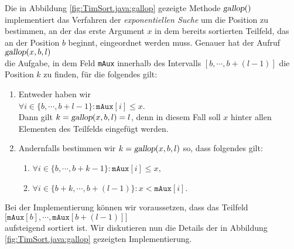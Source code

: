 Die in Abbildung \ref{fig:TimSort.java:gallop} gezeigte Methode $\textsl{gallop}()$ implementiert
das Verfahren der \emph{exponentiellen Suche} um die Position zu bestimmen, an der das erste
Argument $x$ in dem bereits sortierten Teilfeld, das an der Position $b$ beginnt,
eingeordnet werden muss.  Genauer hat der Aufruf
\\[0.2cm]
\hspace*{1.3cm}
$\textsl{gallop}(x, b, l)$
\\[0.2cm]
die Aufgabe, in dem Feld \texttt{mAux} innerhalb des Intervalls $[b, \cdots, b + (l-1)]$ 
die Position $k$ zu finden, f\"ur die folgendes gilt:
\begin{enumerate}
\item Entweder haben wir
      \\[0.2cm]
      \hspace*{1.3cm}
      $\forall i \in \{ b, \cdots, b + l - 1 \}: \mathtt{mAux}[i] \leq x$.
      \\[0.2cm]
      Dann gilt $k = \textsl{gallop}(x, b, l) = l$, denn in diesem Fall soll $x$ hinter allen
      Elementen des Teilfelds eingef\"ugt werden.
\item Andernfalls bestimmen wir $k = \textsl{gallop}(x, b, l)$ so, dass folgendes gilt:
      \begin{enumerate}
      \item $\forall i \in \{ b, \cdots, b + k - 1 \}: \mathtt{mAux}[i] \leq x$,
      \item $\forall i \in \{ b + k, \cdots, b + (l - 1) \}: x < \mathtt{mAux}[i]$.
      \end{enumerate}
\end{enumerate}
Bei der Implementierung k\"onnen wir voraussetzen, dass das Teilfeld 
\\[0.2cm]
\hspace*{1.3cm}
$\bigl[\mathtt{mAux}[b], \cdots, \mathtt{mAux}[b + (l-1)]\bigr]$
\\[0.2cm]
aufsteigend sortiert ist.
Wir diskutieren nun die Details der in Abbildung \ref{fig:TimSort.java:gallop} gezeigten Implementierung.
